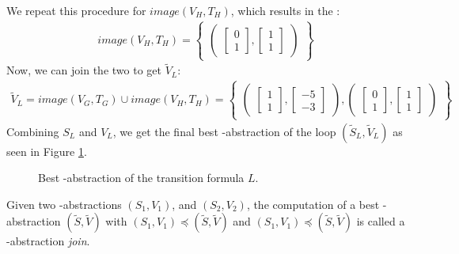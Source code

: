 We repeat this procedure for $image(V_H, T_H)$, which results in the \qvasr:
\begin{align*}
	image(V_H, T_H) = 
	\begin{Bmatrix}
		\begin{pmatrix}
			\begin{bmatrix}
				0 \\
				1 
			\end{bmatrix},
			\begin{bmatrix}
				1 \\
				1 
			\end{bmatrix}
		\end{pmatrix}
	\end{Bmatrix}
\end{align*}  	
Now, we can join the two \qvasr to get $\tilde{V}_L$:
\begin{align*}
		\tilde{V}_L = image(V_G, T_G) \cup image(V_H, T_H) = 
	\begin{Bmatrix}
		\begin{pmatrix}
			\begin{bmatrix}
				1 \\
				1 
			\end{bmatrix},
			\begin{bmatrix}
				-5 \\
				-3 
			\end{bmatrix}
		\end{pmatrix}, 
		\begin{pmatrix}
			\begin{bmatrix}
				0 \\
				1 
			\end{bmatrix},
			\begin{bmatrix}
				1 \\
				1 
			\end{bmatrix}
		\end{pmatrix}
	\end{Bmatrix}
\end{align*}
Combining $S_L$ and $V_L$, we get the final best \qvasr-abstraction of the loop $(\tilde{S}_L, \tilde{V}_L)$ as seen in Figure \ref{vasr}.
\begin{center}
	\begin{figure}[H]
		
		\caption{Best \qvasr-abstraction of the transition formula $L$.}
		\label{vasr}
	\end{figure}
\end{center}
Given two \qvasr-abstractions $(S_1, V_1)$, and $(S_2, V_2)$, the computation of a best \qvasr-abstraction $(\tilde{S}, \tilde{V})$ with $(S_1, V_1) \preceq (\tilde{S}, \tilde{V})$ and  $(S_1, V_1) \preceq (\tilde{S}, \tilde{V})$ is called a \qvasr-abstraction \textsl{join}.

